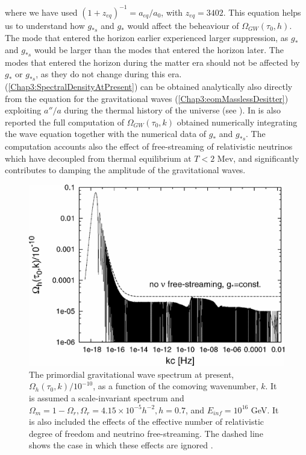 \documentclass[11pt,a4paper,twoside]{book}
\begin{document}
where we have used $ (1+z_{eq})^{-1} = a_{eq}/a_{0} $, with $ z_{eq}=3402 $. This equation helps us to understand how $ g_{*s} $ and $g_{*}$ would affect the beheaviour of $ \Omega_{GW}(\tau_{0},h) $.\\
The mode that entered the horizon earlier experienced larger suppression, as $ g_{*} $ and $ g_{*s} $ would be larger than the modes that entered the horizon later. The modes that entered the horizon during the matter era should not be affected by $ g_{*} $ or $ g_{*s} $, as they do not change during this era. (\ref{Chap3:SpectralDensityAtPresent}) can be obtained analytically also  directly from  the equation for the gravitational waves (\ref{Chap3:eomMasslessDesitter}) exploiting $ a''/a $ during the thermal history of the universe (see \cite{Chap3:GW_Watanabe_Komatsu}). 
In \cite{Chap3:GW_Watanabe_Komatsu} is also reported the full  computation of $ \Omega_{GW}(\tau_{0},k) $ obtained numerically integrating the wave equation together with the numerical data of $ g_{*} $ and $ g_{*s} $. The computation accounts also the effect of free-streaming of relativistic neutrinos which have decoupled from thermal equilibrium at $T < 2 $ Mev, and significantly contributes to damping the amplitude of the gravitational waves.\\
\begin{figure}
	\centering
	\includegraphics[width=0.7\linewidth, height=0.25\textheight]{Images/Chap3/Watanabe_Komatsu_Fig4}
	\caption{The primordial gravitational wave spectrum at present, $\Omega_{h}(\tau_{0},k)/10^{-10}$, as a function of the comoving wavenumber, $ k $. It is assumed a scale-invariant spectrum and $\Omega_{m}=1-\Omega_{r}, \Omega_{r} = 4.15 \times 10^{-5} h^{-2}, h=0.7$, and $ E_{inf}=10^{16} $ GeV. It is also included the effects of the effective number of relativistic degree of freedom and neutrino free-streaming. The dashed line shows the case in which these effects are ignored \cite{Chap3:GW_Watanabe_Komatsu}.}
	\label{fig:watanabekomatsufig4}
\end{figure}
\end{document}
